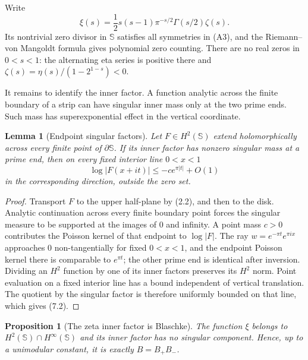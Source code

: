\documentclass[11pt]{article}
\newtheorem{proposition}[theorem]{Proposition}
\newtheorem{lemma}[theorem]{Lemma}
\theoremstyle{definition}
\theoremstyle{remark}
\begin{document}
Write
\[
 \xi(s)=\frac12s(s-1)\pi^{-s/2}\Gamma(s/2)\zeta(s).   \tag{7.1}
\]
Its nontrivial zero divisor in $\mathbb S$ satisfies all symmetries in (A3), and
the Riemann--von Mangoldt formula gives polynomial zero counting.  There are no
real zeros in $0<s<1$: the alternating eta series is positive there and
$\zeta(s)=\eta(s)/(1-2^{1-s})<0$.

It remains to identify the inner factor.  A function analytic across the finite
boundary of a strip can have singular inner mass only at the two prime ends.
Such mass has superexponential effect in the vertical coordinate.

\begin{lemma}[Endpoint singular factors]\label{lem:singular}
Let $F\in H^2(\mathbb S)$ extend holomorphically across every finite point of
$\partial\mathbb S$.  If its inner factor has nonzero singular mass at a prime
end, then on every fixed interior line $0<x<1$
\[
              \log|F(x+it)|\le -c e^{\pi|t|}+O(1)     \tag{7.2}
\]
in the corresponding direction, outside the zero set.
\end{lemma}

\begin{proof}
Transport $F$ to the upper half-plane by (2.2), and then to the disk.  Analytic
continuation across every finite boundary point forces the singular measure to
be supported at the images of $0$ and infinity.  A point mass $c>0$ contributes
the Poisson kernel of that endpoint to $\log|F|$.  The ray
$w=e^{-\pi t}e^{\pi ix}$ approaches $0$ non-tangentially for fixed $0<x<1$,
and the endpoint Poisson kernel there is comparable to $e^{\pi t}$; the other
prime end is identical after inversion.  Dividing an $H^2$ function by one of
its inner factors preserves its $H^2$ norm.  Point evaluation on a fixed
interior line has a bound independent of vertical translation.  The quotient
by the singular factor is therefore uniformly bounded on that line, which
gives (7.2).
\end{proof}

\begin{proposition}[The zeta inner factor is Blaschke]\label{prop:xi-inner}
The function $\xi$ belongs to $H^2(\mathbb S)\cap H^\infty(\mathbb S)$ and its
inner factor has no singular component.  Hence, up to a unimodular constant, it
is exactly $B=B_+B_-$.
\end{proposition}
\end{document}
